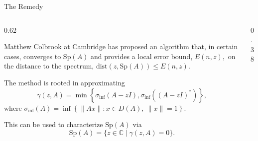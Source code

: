 \documentclass[aspectratio=169]{beamer}
\begin{document}
\begin{frame}{The Remedy}

    \begin{columns}[T]

    \begin{column}{0.62\textwidth}

    Matthew Colbrook at Cambridge has proposed an algorithm that, in certain cases, converges to $\text{Sp}(A)$ and provides a local error bound, $E(n,z),$ on the distance to the spectrum, $ \text{dist}(z, \text{Sp}(A)) \le E(n, z).$  

    \vspace{1em}

    The method is rooted in approximating
    $$  \gamma(z,A)=\min\left\{
\sigma_{\inf}(A-zI),
\sigma_{\inf}\left((A-zI)^*\right)
\right\},$$
where $\sigma_{\inf}(A) = 
\inf\left\{
\|Ax\| : x \in D(A),\ \|x\|=1
\right\}.$

 \vspace{1em}
This can be used to characterize $\text{Sp}(A)$ via
$$ \text{Sp}(A) = \{ z \in \mathbb{C} \mid \gamma(z, A) = 0 \}.$$

\end{column}
\begin{column}{0.38\textwidth}


\end{column}
\end{columns}
\end{frame}
\end{document}
